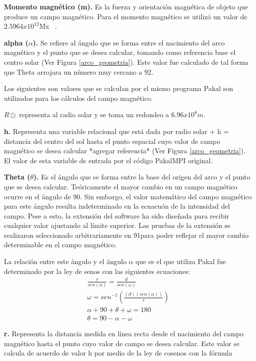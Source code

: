 \textbf{Momento magn\'etico (m).} Es la fuerza y orientaci\'on magn\'etica de  objeto que produce un campo magn\'etico. Para el momento magn\'etico se utiliz\'o un valor de $2.5964x10^{12}$Mx ~\citep{mariska}.

\textbf{alpha ($\alpha$).} Se refiere al \'angulo que se forma entre el nacimiento del arco magn\'etico y el punto que se desea calcular, tomando como referencia base el centro solar (Ver Figura \ref{arco_geometria}). Este valor fue calculado de tal forma que Theta arrojara un n\'umero muy cercano a 92\degree.

Los siguientes son valores que se calculan por el mismo programa Pakal son utilizados para los c\'alculos del campo magn\'etico.


\textbf{\(R\odot\)}  representa al radio solar y se toma un redondeo a $6.96x10^8m$.

\textbf{h.} Representa una variable relacional que est\'a dada por radio solar + h = distancia del centro del sol hasta el punto espacial cuyo valor de campo magnético se desea calcular *agregar referencia*
(Ver Figura \ref{arco_geometria}). El valor de esta variable de entrada por el c\'odigo PakalMPI original.

\textbf{Theta ($\theta$). }Es el \'angulo que se forma entre la base del origen del arco y el punto que se desea calcular. Te\'oricamente el mayor cambio en un campo magn\'etico ocurre en el \'angulo de 90\degree. Sin embargo, el valor matem\'atico del campo magn\'etico para este \'angulo resulta indeterminado en la ecuacu\'on de la intensidad del campo. Pese a esto, la extensi\'on del software ha sido diseñada para recibir cualquier valor ajustando al l\'imite superior.
Las pruebas de la extensi\'on se realizaron seleccionado arbitrariamente en 91\degree para poder reflejar el mayor cambio determinable en el campo magn\'etico.

La relaci\'on entre este \'angulo y el \'angulo $\alpha$ que es el que utiliza Pakal fue determinado por la ley de senos con las siguientes ecuaciones:
\begin{gather*} \label{theta_equation}
\frac{r}{sen(\alpha)} = \frac{d}{sen(\omega)} \\
\omega = sen^{-1}(\frac{(d)(sen(\alpha))}{r}) \\
\alpha + 90 + \theta + \omega = 180 \\
\theta = 90 - \alpha - \omega
\end{gather*}

\textbf{r. }Representa la distancia medida en l\'inea recta desde el nacimiento del campo magn\'etico hasta el punto cuyo valor de campo se desea calcular. Este valor se calcula de acuerdo de valor h por medio de la ley de cosenos con la f\'ormula
 
